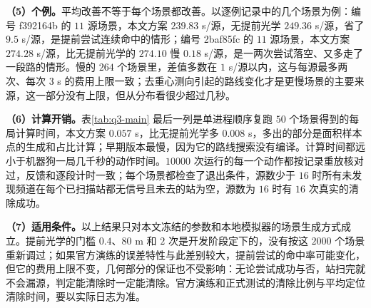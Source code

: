 \textbf{（5）个例。}平均改善不等于每个场景都改善。以逐例记录中的几个场景为例：编号 f392164b 的 $11$ 源场景，本文方案 $239.83$ s/源，无提前光学 $249.36$ s/源，省了 $9.5$ s/源，是提前尝试连续命中的情形；编号 2baf85fc 的 $11$ 源场景，本文方案 $274.28$ s/源，比无提前光学的 $274.10$ 慢 $0.18$ s/源，是一两次尝试落空、又多走了一段路的情形。慢的 $264$ 个场景里，差值多数在 $1$ s/源以内，这与每源最多两次、每次 $3$ s 的费用上限一致；去重心测向引起的路线变化才是更慢场景的主要来源，这一部分没有上限，但从分布看很少超过几秒。

\textbf{（6）计算开销。}表\ref{tab:q3-main} 最后一列是单进程顺序复跑 $50$ 个场景得到的每局计算时间，本文方案 $0.057$ s，比无提前光学多 $0.008$ s，多出的部分是面积样本点的生成和占比计算；早期版本最慢，因为它的路线搜索没有编译。计算时间都远小于机器狗一局几千秒的动作时间。$10000$ 次运行的每一个动作都按记录重放核对过，反馈和逐段计时一致；每个场景都检查了退出条件，源数少于 $16$ 时所有未发现频道在每个已扫描站都无信号且未去的站为空，源数为 $16$ 时有 $16$ 次真实的清除成功。

\textbf{（7）适用条件。}以上结果只对本文冻结的参数和本地模拟器的场景生成方式成立。提前光学的门槛 $0.4$、$80$ m 和 $2$ 次是开发阶段定下的，没有按这 $2000$ 个场景重新调过；如果官方演练的误差特性与此差别较大，提前尝试的命中率可能变化，但它的费用上限不变，几何部分的保证也不受影响：无论尝试成功与否，站扫完就不会漏源，判定能清除时一定能清除。官方演练和正式测试的清除比例与平均定位清除时间，要以实际日志为准。
